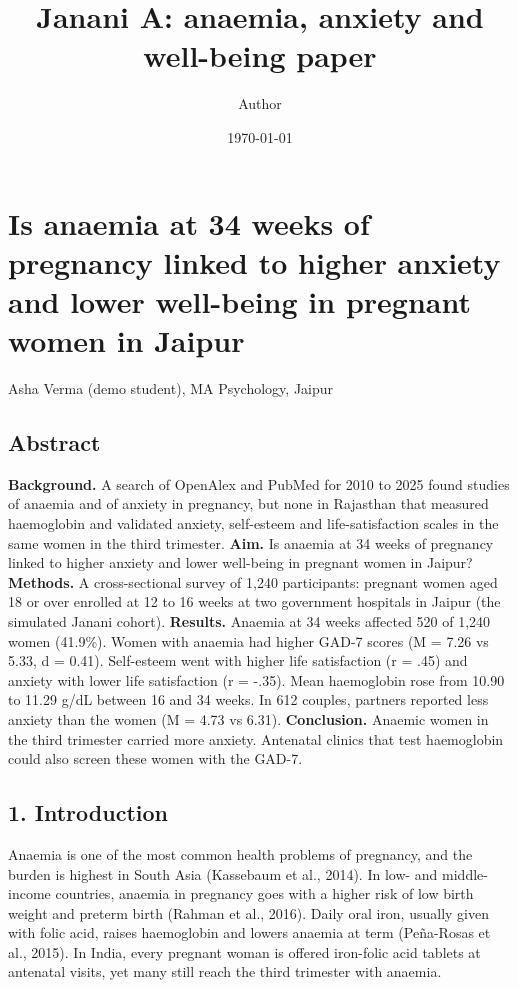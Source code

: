 \documentclass[12pt]{article}
\title{Janani A: anaemia, anxiety and well-being paper}
\author{Author}
\date{\today}
\begin{document}
\maketitle

\section{Is anaemia at 34 weeks of pregnancy linked to higher anxiety and lower well-being in pregnant women in Jaipur}

Asha Verma (demo student), MA Psychology, Jaipur

\subsection{Abstract}

\textbf{Background.} A search of OpenAlex and PubMed for 2010 to 2025 found studies of anaemia and of anxiety in pregnancy, but none in Rajasthan that measured haemoglobin and validated anxiety, self-esteem and life-satisfaction scales in the same women in the third trimester. \textbf{Aim.} Is anaemia at 34 weeks of pregnancy linked to higher anxiety and lower well-being in pregnant women in Jaipur? \textbf{Methods.} A cross-sectional survey of 1,240 participants: pregnant women aged 18 or over enrolled at 12 to 16 weeks at two government hospitals in Jaipur (the simulated Janani cohort). \textbf{Results.} Anaemia at 34 weeks affected 520 of 1,240 women (41.9\%). Women with anaemia had higher GAD-7 scores (M = 7.26 vs 5.33, d = 0.41). Self-esteem went with higher life satisfaction (r = .45) and anxiety with lower life satisfaction (r = -.35). Mean haemoglobin rose from 10.90 to 11.29 g/dL between 16 and 34 weeks. In 612 couples, partners reported less anxiety than the women (M = 4.73 vs 6.31). \textbf{Conclusion.} Anaemic women in the third trimester carried more anxiety. Antenatal clinics that test haemoglobin could also screen these women with the GAD-7.

\subsection{1. Introduction}

Anaemia is one of the most common health problems of pregnancy, and the burden is highest in South Asia (Kassebaum et al., 2014). In low- and middle-income countries, anaemia in pregnancy goes with a higher risk of low birth weight and preterm birth (Rahman et al., 2016). Daily oral iron, usually given with folic acid, raises haemoglobin and lowers anaemia at term (Peña-Rosas et al., 2015). In India, every pregnant woman is offered iron-folic acid tablets at antenatal visits, yet many still reach the third trimester with anaemia.
\end{document}
